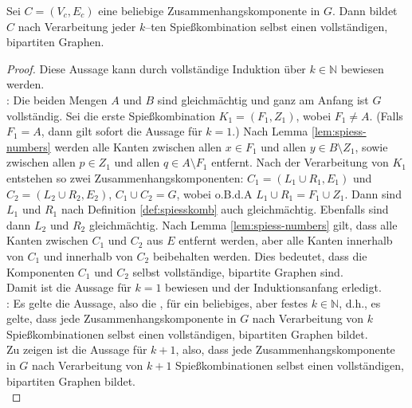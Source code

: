 \begin{lemma}\label{lem:komponente-complete}
Sei $C = (V_c, E_c)$ eine beliebige Zusammenhangskomponente in $G$. 
Dann bildet $C$ nach Verarbeitung jeder $k$--ten Spießkombination
selbst einen vollständigen, bipartiten Graphen.
\end{lemma}

\begin{proof}
Diese Aussage kann durch vollständige Induktion über $k \in \mathbb{N}$ bewiesen werden.\\

\noindent
{}: 
Die beiden Mengen $A$ und $B$ sind gleichmächtig und ganz am Anfang ist $G$ vollständig.
Sei die erste Spießkombination $K_1 = (F_1, Z_1)$, wobei $F_1 \neq A$. (Falls $F_1 = A$,
dann gilt sofort die Aussage für $k = 1$.)
Nach Lemma \ref{lem:spiess-numbers} werden alle Kanten zwischen 
allen $x \in F_1$ und allen $y \in B \setminus Z_1$,
sowie zwischen allen $p \in Z_1$ und allen $q \in A \setminus F_1$ entfernt.
Nach der Verarbeitung von $K_1$ 
entstehen so zwei Zusammenhangskomponenten:
$C_1 = (L_1 \cup R_1, E_1)$ und $C_2 = (L_2 \cup R_2, E_2)$,
$C_1 \cup C_2 = G$, wobei o.B.d.A $L_1 \cup R_1 = F_1 \cup Z_1$.
Dann sind $L_1$ und $R_1$
nach Definition \ref{def:spiesskomb} auch gleichmächtig. 
Ebenfalls sind dann $L_2$ und $R_2$ gleichmächtig.
Nach Lemma \ref{lem:spiess-numbers} gilt, dass alle Kanten zwischen $C_1$ und $C_2$
aus $E$ entfernt werden, aber alle Kanten innerhalb von $C_1$ und innerhalb von $C_2$
beibehalten werden.
Dies bedeutet, dass die Komponenten $C_1$ und $C_2$ selbst vollständige, bipartite Graphen sind.\\
Damit ist die Aussage für $k = 1$ bewiesen und der Induktionsanfang erledigt.\\

\noindent
{}: Es gelte die Aussage, also die ,
für ein beliebiges, aber festes $k \in \mathbb{N}$, d.h., es gelte,
dass jede Zusammenhangskomponente in $G$ nach Verarbeitung von $k$ Spießkombinationen selbst
einen vollständigen, bipartiten Graphen bildet.\\

Zu zeigen ist die Aussage für $k + 1$, also, dass jede Zusammenhangskomponente in $G$ nach Verarbeitung
von $k + 1$ Spießkombinationen selbst einen vollständigen, bipartiten Graphen bildet.\\


\end{proof}
